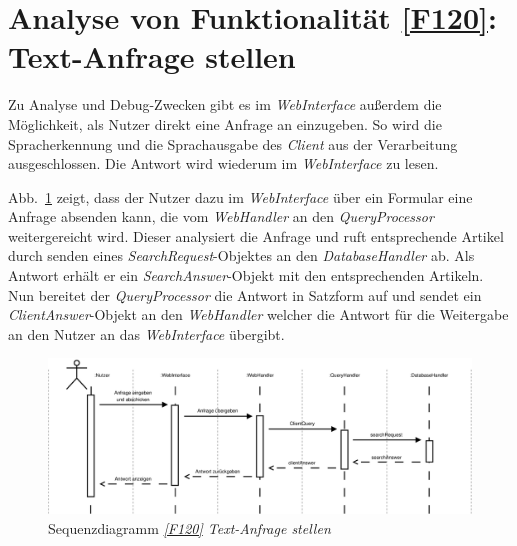 \section{Analyse von Funktionalität \ref{F120}: Text-Anfrage stellen}


Zu Analyse und Debug-Zwecken gibt es im \textit{WebInterface} außerdem die
Möglichkeit, als Nutzer direkt eine Anfrage an \NewsGenie einzugeben. So wird
die Spracherkennung und die Sprachausgabe des \textit{Client} aus der
Verarbeitung ausgeschlossen. Die Antwort wird wiederum im \textit{WebInterface}
zu lesen.

Abb.~\ref{sd120} zeigt, dass der Nutzer dazu im \textit{WebInterface} über ein
Formular eine Anfrage absenden kann, die vom \textit{WebHandler} an den
\textit{QueryProcessor} weitergereicht wird. Dieser analysiert die Anfrage und
ruft entsprechende Artikel durch senden eines \textit{SearchRequest}-Objektes an
den \textit{DatabaseHandler} ab. Als Antwort erhält er ein
\textit{SearchAnswer}-Objekt mit den entsprechenden Artikeln. Nun bereitet der
\textit{QueryProcessor} die Antwort in Satzform auf und sendet ein
\textit{ClientAnswer}-Objekt an den \textit{WebHandler} welcher die Antwort für
die Weitergabe an den Nutzer an das \textit{WebInterface} übergibt.

\begin{figure}[h]
\centering
\includegraphics[width=1\textheight, angle=90]{Systementwurf/02_produktfunktionsanalyse/f1200}
\caption{Sequenzdiagramm \textit{\ref{F120} Text-Anfrage stellen}
\label{sd120}}
\end{figure}